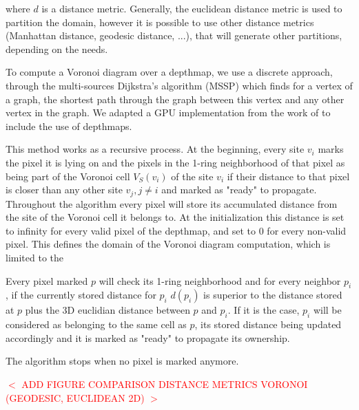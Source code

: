 \documentclass[11pt,fleqn]{book} %
\newcommand{\arnaud}[1]{\textcolor{red}{$<$ #1 $>$}}
\begin{document}
where $d$ is a distance metric. Generally, the euclidean distance metric is used to partition the domain, however it is possible to use other distance metrics (Manhattan distance, geodesic distance, ...), that will generate other partitions, depending on the needs.

To compute a Voronoi diagram over a depthmap, we use a discrete approach, through the multi-sources Dijkstra's algorithm (MSSP) \cite{Dij59} which finds for a vertex of a graph, the shortest path through the graph between this vertex and any other vertex in the graph.
We adapted a GPU implementation from the work of \cite{PPA16} to include the use of depthmaps.

This method works as a recursive process. 
At the beginning, every site $v_i$ marks the pixel it is lying on and the pixels in the 1-ring neighborhood of that pixel as being part of the Voronoi cell $V_S(v_i)$ of the site $v_i$ if their distance to that pixel is closer than any other site $v_j, j \neq i$ and marked as "ready" to propagate.
Throughout the algorithm every pixel will store its accumulated distance from the site of the Voronoi cell it belongs to. 
At the initialization this distance is set to infinity for every valid pixel of the depthmap, and set to 0 for every non-valid pixel.
This defines the domain of the Voronoi diagram computation, which is limited to the 

Every pixel marked $p$ will check its 1-ring neighborhood and for every neighbor $p_i$, if the currently stored distance for $p_i$ $d(p_i)$ is superior to the distance stored at $p$ plus the 3D euclidian distance between $p$ and $p_i$. 
If it is the case, $p_i$ will be considered as belonging to the same cell as $p$, its stored distance being updated accordingly and it is marked as "ready" to propagate its ownership.

The algorithm stops when no pixel is marked anymore.

\arnaud{ADD FIGURE COMPARISON DISTANCE METRICS VORONOI (GEODESIC, EUCLIDEAN 2D)}
\end{document}
